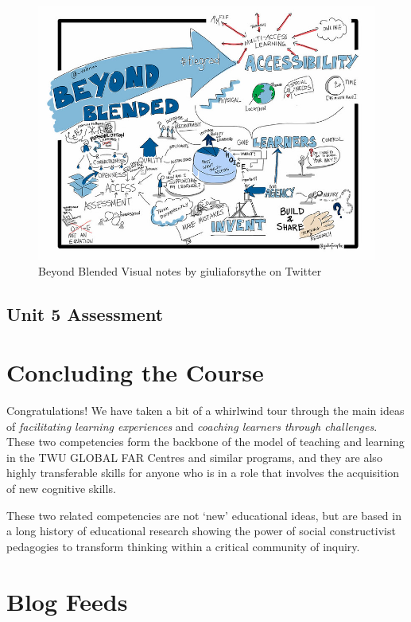 \documentclass[
]{book}
\begin{document}
\begin{figure}
\centering
\includegraphics{assets/U5/U5LAImage.jpg}
\caption{Beyond Blended Visual notes by giuliaforsythe on Twitter}
\end{figure}

\hypertarget{unit-5-assessment}{%
\section*{Unit 5 Assessment}\label{unit-5-assessment}}

\hypertarget{concluding-the-course}{%
\chapter{Concluding the Course}\label{concluding-the-course}}

Congratulations! We have taken a bit of a whirlwind tour through the main ideas of \emph{facilitating learning experiences} and \emph{coaching learners through challenges}. These two competencies form the backbone of the model of teaching and learning in the TWU GLOBAL FAR Centres and similar programs, and they are also highly transferable skills for anyone who is in a role that involves the acquisition of new cognitive skills.

These two related competencies are not `new' educational ideas, but are based in a long history of educational research showing the power of social constructivist pedagogies to transform thinking within a critical community of inquiry.

\hypertarget{blog-feeds}{%
\chapter*{Blog Feeds}\label{blog-feeds}}
\end{document}

